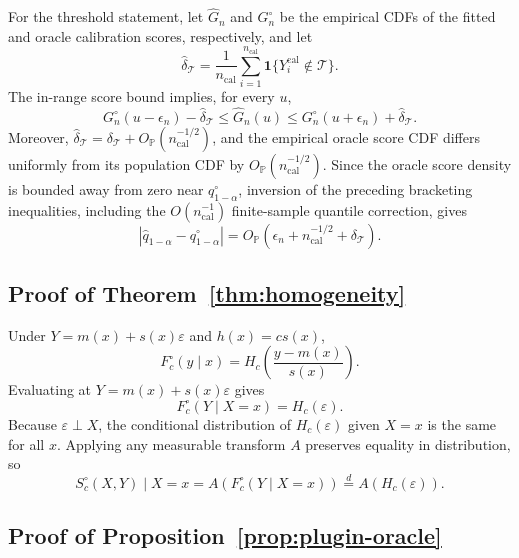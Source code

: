 \documentclass[11pt]{article}
\newcommand{\Tcal}{\mathcal T}
\newcommand{\ind}{\mathbf 1}
\newcommand{\abs}[1]{\left\lvert #1 \right\rvert}
\newcommand{\Op}{O_{\mathbb P}}
\begin{document}
For the threshold statement, let \(\widehat G_n\) and \(G_n^\circ\) be the
empirical CDFs of the fitted and oracle calibration scores, respectively,
and let
\[
  \widehat\delta_{\Tcal}
  =
  \frac{1}{n_{\mathrm{cal}}}
  \sum_{i=1}^{n_{\mathrm{cal}}}
  \ind\{Y_i^{\mathrm{cal}}\notin\Tcal\}.
\]
The in-range score bound implies, for every \(u\),
\[
  G_n^\circ(u-\epsilon_n)-\widehat\delta_{\Tcal}
  \le
  \widehat G_n(u)
  \le
  G_n^\circ(u+\epsilon_n)+\widehat\delta_{\Tcal}.
\]
Moreover,
\(\widehat\delta_{\Tcal}
=\delta_{\Tcal}+\Op(n_{\mathrm{cal}}^{-1/2})\), and the empirical oracle
score CDF differs uniformly from its population CDF by
\(\Op(n_{\mathrm{cal}}^{-1/2})\). Since the oracle score density is bounded
away from zero near \(q^\circ_{1-\alpha}\), inversion of the preceding
bracketing inequalities, including the \(O(n_{\mathrm{cal}}^{-1})\)
finite-sample quantile correction, gives
\[
  \abs{\widehat q_{1-\alpha}-q^\circ_{1-\alpha}}
  =
  \Op\!\left(
  \epsilon_n+n_{\mathrm{cal}}^{-1/2}+\delta_{\Tcal}
  \right).
\]

\subsection{Proof of Theorem~\ref{thm:homogeneity}}

Under \(Y=m(x)+s(x)\varepsilon\) and \(h(x)=c s(x)\),
\[
  F_c^\circ(y\mid x)=
  H_c\!\left(\frac{y-m(x)}{s(x)}\right).
\]
Evaluating at \(Y=m(x)+s(x)\varepsilon\) gives
\[
  F_c^\circ(Y\mid X=x)
  =
  H_c(\varepsilon).
\]
Because \(\varepsilon\perp X\), the conditional distribution of \(H_c(\varepsilon)\) given \(X=x\) is the same for all \(x\). Applying any measurable transform \(A\) preserves equality in distribution, so
\[
  S_c^\circ(X,Y)\mid X=x
  =
  A(F_c^\circ(Y\mid X=x))
  \overset{d}{=}
  A(H_c(\varepsilon)).
\]

\subsection{Proof of Proposition~\ref{prop:plugin-oracle}}
\end{document}
